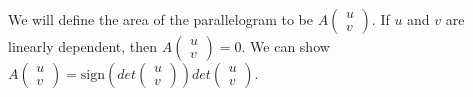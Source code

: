 \documentclass[12pt]{article}
\begin{document}
\begin{center}
\end{center}

We will define the area of the parallelogram to be $A\begin{pmatrix}
u \\ v
\end{pmatrix}$. If $u$ and $v$ are linearly dependent, then $A \begin{pmatrix}
u \\ v
\end{pmatrix} = 0$. We can show $A \begin{pmatrix}
u \\ v
\end{pmatrix} = \text{sign}\left(det\begin{pmatrix}
u \\ v
\end{pmatrix} \right)det\begin{pmatrix}
u \\ v
\end{pmatrix}$.

\vspace{1em}
\end{document}

